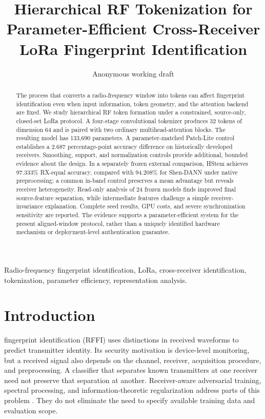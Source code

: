 \documentclass[journal]{IEEEtran}
\begin{document}
\title{Hierarchical RF Tokenization for Parameter-Efficient Cross-Receiver LoRa Fingerprint Identification}
\author{Anonymous working draft}
\maketitle
\begin{abstract}
The process that converts a radio-frequency window into tokens can affect fingerprint identification even when input information, token geometry, and the attention backend are fixed. We study hierarchical RF token formation under a constrained, source-only, closed-set LoRa protocol. A four-stage convolutional tokenizer produces 32 tokens of dimension 64 and is paired with two ordinary multihead-attention blocks. The resulting model has 133,690 parameters. A parameter-matched Patch-Lite control establishes a 2.687 percentage-point accuracy difference on historically developed receivers. Smoothing, support, and normalization controls provide additional, bounded evidence about the design. In a separately frozen external comparison, HStem achieves 97.333\% RX-equal accuracy, compared with 94.208\% for Shen-DANN under native preprocessing; a common in-band control preserves a mean advantage but reveals receiver heterogeneity. Read-only analysis of 24 frozen models finds improved final source-feature separation, while intermediate features challenge a simple receiver-invariance explanation. Complete seed results, GPU costs, and severe synchronization sensitivity are reported. The evidence supports a parameter-efficient system for the present aligned-window protocol, rather than a uniquely identified hardware mechanism or deployment-level authentication guarantee.
\end{abstract}
\begin{IEEEkeywords}
Radio-frequency fingerprint identification, LoRa, cross-receiver identification, tokenization, parameter efficiency, representation analysis.
\end{IEEEkeywords}

\section{Introduction}
 fingerprint identification (RFFI) uses distinctions in received waveforms to predict transmitter identity. Its security motivation is device-level monitoring, but a received signal also depends on the channel, receiver, acquisition procedure, and preprocessing. A classifier that separates known transmitters at one receiver need not preserve that separation at another. Receiver-aware adversarial training, spectral processing, and information-theoretic regularization address parts of this problem \cite{shen2024receiver,liu2026ask,wang2026ib}. They do not eliminate the need to specify available training data and evaluation scope.
\end{document}
